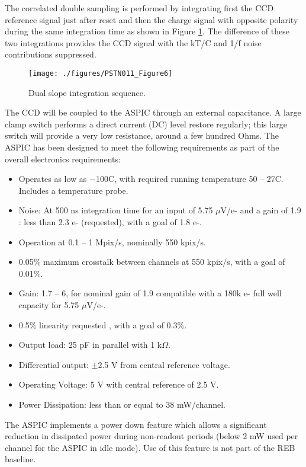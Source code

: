 The correlated double sampling is performed by integrating first the CCD reference signal just after reset and then the charge signal with opposite polarity during the same integration time as shown in Figure \ref{fig:Fig6}. The difference of these two integrations provides the CCD signal with the kT/C and 1/f noise contributions suppressed.

 \begin{figure}[htbp]
\begin{center}
\texttt{[image: ./figures/PSTN011\_Figure6]}
\caption{Dual slope integration sequence.}
\label{fig:Fig6}
\end{center}
\end{figure}

The CCD will be coupled to the ASPIC through an external capacitance. A large clamp switch performs a direct current (DC) level restore regularly; this large switch will provide a very low resistance, around a few hundred Ohms.
The ASPIC has been designed to meet the following requirements as part of the overall electronics requirements:
\begin{itemize}
\item{} Operates as low as $-$100\degsym C, with required running temperature  50 – 27\degsym C. Includes a temperature probe.
\item{} Noise: At 500 ns integration time for an input of 5.75 $\mu$V/e- and a gain of 1.9 : less than  2.3 e- (requested),  with a goal of 1.8 e-.
\item{} Operation at 0.1 – 1 Mpix/s, nominally 550 kpix/s.
\item{} 0.05\% maximum crosstalk between channels at 550 kpix/s, with a goal of 0.01\%.
\item{} Gain: 1.7 – 6, for nominal gain of 1.9 compatible with a 180k e- full well capacity for 5.75 $\mu$V/e-.
\item{} 0.5\% linearity requested , with a goal of 0.3\%.
\item{} Output load: 25 pF in parallel with 1 k$\Omega$.
\item{} Differential output: $\pm$2.5 V from central reference voltage.
\item{} Operating Voltage: 5 V with central reference of 2.5 V.
\item{} Power Dissipation: less than or equal to 38 mW/channel.
\end{itemize}
The ASPIC implements a power down feature which allows a significant reduction in dissipated power during non-readout periods (below 2 mW used per channel for the ASPIC in idle mode). Use of this feature is not part of the REB baseline.

